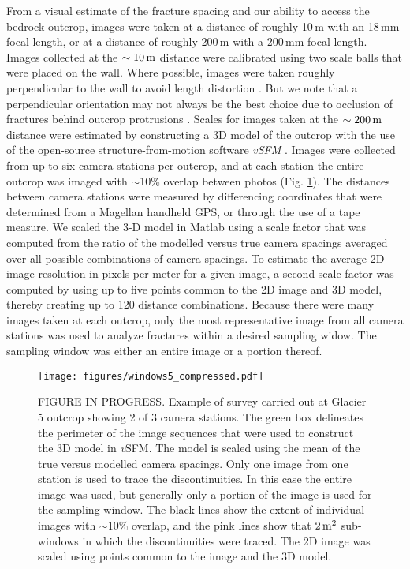\documentclass[review]{igs}
\begin{document}
From a visual estimate of the fracture spacing and our ability to access the bedrock outcrop, images were taken at a distance of roughly 10\,m with an 18\,mm focal length, or at a distance of roughly 200\,m with a 200\,mm focal length. Images collected at the $\rm \sim 10\,m$ distance were calibrated using two scale balls that were placed on the wall. Where possible, images were taken roughly perpendicular to the wall to avoid length distortion \citep{Priest2012}. But we note that a perpendicular orientation may not always be the best choice due to occlusion of fractures behind outcrop protrusions \citep[e.g.][]{Sturzenegger2009}. Scales for images taken at the $\rm \sim 200\,m$ distance were estimated by constructing a 3D model of the outcrop with the use of the open-source structure-from-motion software \emph{vSFM} \citep{Wu2011}. Images were collected from up to six camera stations per outcrop, and at each station the entire outcrop was imaged with $\sim$10\% overlap between photos (Fig. \ref{pg}). The distances between camera stations were measured by differencing coordinates that were determined from a Magellan handheld GPS, or through the use of a tape measure. We scaled the 3-D model in Matlab using a scale factor that was computed from the ratio of the modelled versus true camera spacings averaged over all possible combinations of camera spacings. To estimate the average 2D image resolution in pixels per meter for a given image, a second scale factor was computed by using up to five points common to the 2D image and 3D model, thereby creating up to 120 distance combinations. Because there were many images taken at each outcrop, only the most representative image from all camera stations was used to analyze fractures within a desired sampling widow. The sampling window was either an entire image or a portion thereof. 



\begin{figure}[H]
  \centering
  \texttt{[image: figures/windows5\_compressed.pdf]}
  \caption[]{FIGURE IN PROGRESS. Example of survey carried out at Glacier 5 outcrop showing 2 of 3 camera stations. The green box delineates the perimeter of the image sequences that were used to construct the 3D model in \emph{v}SFM. The model is scaled using the mean of the true versus modelled camera spacings. Only one image from one station is used to trace the discontinuities. In this case the entire image was used, but generally only a portion of the image is used for the sampling window. The black lines show the extent of individual images with $\sim$10\% overlap, and the pink lines show that $\rm 2\,m^2$ sub-windows in which the discontinuities were traced. The 2D image was scaled using points common to the image and the 3D model.}
\label{pg}
\end{figure}
\end{document}
